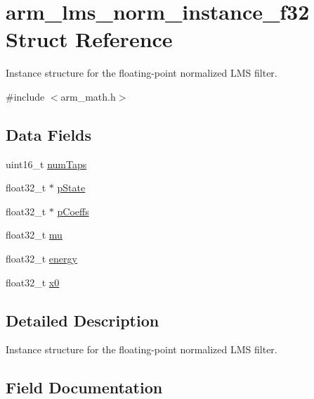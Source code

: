 \hypertarget{structarm__lms__norm__instance__f32}{}\section{arm\+\_\+lms\+\_\+norm\+\_\+instance\+\_\+f32 Struct Reference}
\label{structarm__lms__norm__instance__f32}


Instance structure for the floating-\/point normalized L\+MS filter.  




{\ttfamily \#include $<$arm\+\_\+math.\+h$>$}

\subsection*{Data Fields}
\begin{DoxyCompactItemize}
\item 
uint16\+\_\+t \hyperlink{structarm__lms__norm__instance__f32_a751941891e47f522a7f5375fe8990aac}{num\+Taps}
\item 
float32\+\_\+t $\ast$ \hyperlink{structarm__lms__norm__instance__f32_a335c87e6fdc4b96601d95a5de8b9c463}{p\+State}
\item 
float32\+\_\+t $\ast$ \hyperlink{structarm__lms__norm__instance__f32_aacbb8dd8eeba4b21fc2bb40076405ee3}{p\+Coeffs}
\item 
float32\+\_\+t \hyperlink{structarm__lms__norm__instance__f32_a11402afa7c9b9dac4cb953fa386e74d2}{mu}
\item 
float32\+\_\+t \hyperlink{structarm__lms__norm__instance__f32_ae1ed544b72f1510ed55d144a9424fddd}{energy}
\item 
float32\+\_\+t \hyperlink{structarm__lms__norm__instance__f32_ab56b6f83c5b324c3ef620474b6e5a6e1}{x0}
\end{DoxyCompactItemize}


\subsection{Detailed Description}
Instance structure for the floating-\/point normalized L\+MS filter. 

\subsection{Field Documentation}
\mbox{\label{structarm__lms__norm__instance__f32_ae1ed544b72f1510ed55d144a9424fddd}} 
